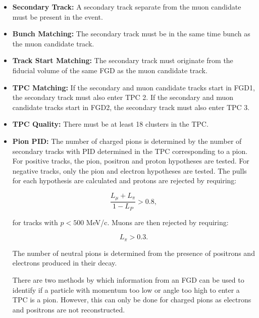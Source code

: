 \begin{itemize}

\item \textbf{Secondary Track:} A secondary track separate from the muon candidate must be present in the event.

\item \textbf{Bunch Matching:} The secondary track must be in the same time bunch as the muon candidate track.

\item \textbf{Track Start Matching:} The secondary track must originate from the fiducial volume of the same FGD as the muon candidate track.

\item \textbf{TPC Matching:} If the secondary and muon candidate tracks start in FGD1, the secondary track must also enter TPC 2. If the secondary and muon candidate tracks start in FGD2, the secondary track must also enter TPC 3. 

\item \textbf{TPC Quality:} There must be at least 18 clusters in the TPC. 

\item \textbf{Pion PID:} The number of charged pions is determined by the number of secondary tracks with PID determined in the TPC corresponding to a pion. For positive tracks, the pion, positron and proton hypotheses are tested. For negative tracks, only the pion and electron hypotheses are tested. The pulls for each hypothesis are calculated and protons are rejected by requiring:

\begin{equation}
\frac{L_{\mu}+L_{\pi}}{1-L_P} > 0.8,
\end{equation}

for tracks with $p < 500$ MeV/c. Muons are then rejected by requiring:

\begin{equation}
L_{\pi} > 0.3.
\end{equation}

The number of neutral pions is determined from the presence of positrons and electrons produced in their decay.

There are two methods by which information from an FGD can be used to identify if a particle with momentum too low or angle too high to enter a TPC is a pion. However, this can only be done for charged pions as electrons and positrons are not reconstructed. 

\begin{itemize}


\end{itemize}
\end{itemize}
